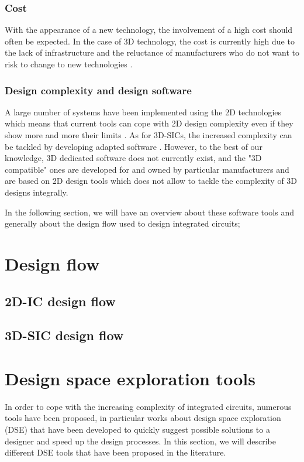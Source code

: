 \subsubsection{Cost}
With the appearance of a new technology, the involvement of a high cost should often be expected. In the case of 3D technology, the cost is currently high due to the lack of infrastructure and the reluctance of manufacturers who do not want to risk to change to new technologies \cite{659500}.

\subsubsection{Design complexity and design software}
A large number of systems have been implemented using the 2D technologies which means that current tools can cope with 2D design complexity even if they show more and more their limits \cite{vanderbiest06, PFF10}. As for 3D-SICs, the increased complexity can be tackled by developing adapted software \cite{659500}. However, to the best of our knowledge, 3D dedicated software does not currently exist, and the "3D compatible" ones are developed for and owned by particular manufacturers and are based on 2D design tools which does not allow to tackle the complexity of 3D designs integrally.

In the following section, we will have an overview about these software tools and generally about the design flow used to design integrated circuits;

\section{Design flow}

\subsection{2D-IC design flow}


\subsection{3D-SIC design flow}


\section{Design space exploration tools}

In order to cope with the increasing complexity of integrated circuits, numerous tools have been proposed, in particular works about design space exploration (DSE) that have been developed to quickly suggest possible solutions to a designer and speed up the design processes. In this section, we will describe different DSE tools that have been proposed in the literature.

